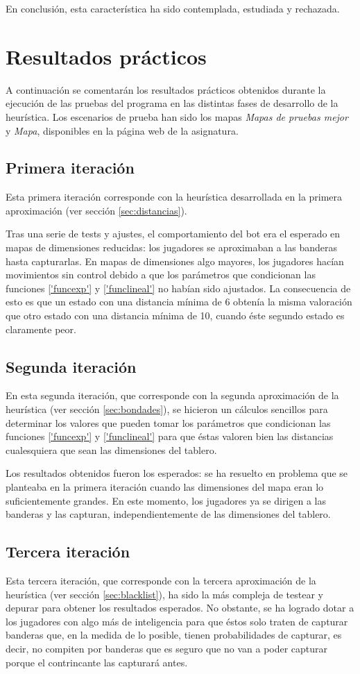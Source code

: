 En conclusión, esta característica ha sido contemplada, estudiada y
rechazada.

\section {Resultados prácticos}
A continuación se comentarán los resultados prácticos obtenidos
durante la ejecución de las pruebas del programa en las distintas
fases de desarrollo de la heurística. Los escenarios de prueba han
sido los mapas \emph{Mapas de pruebas mejor} y \emph{Mapa},
disponibles en la página web de la asignatura.

\subsection{Primera iteración}
Esta primera iteración corresponde con la heurística desarrollada en
la primera aproximación (ver sección \ref{sec:distancias}).

Tras una serie de tests y ajustes, el comportamiento del bot era el
esperado en mapas de dimensiones reducidas: los jugadores se
aproximaban a las banderas hasta capturarlas. En mapas de dimensiones
algo mayores, los jugadores hacían movimientos sin control debido a
que los parámetros que condicionan las funciones \ref{'funcexp'} y
\ref{'funclineal'} no habían sido ajustados. La consecuencia de esto
es que un estado con una distancia mínima de 6 obtenía la misma
valoración que otro estado con una distancia mínima de 10, cuando éste
segundo estado es claramente peor.

\subsection{Segunda iteración}
En esta segunda iteración, que corresponde con la segunda aproximación
de la heurística (ver sección \ref{sec:bondades}), se hicieron un
cálculos sencillos para determinar los valores que pueden tomar los
parámetros que condicionan las funciones \ref{'funcexp'} y
\ref{'funclineal'} para que éstas valoren bien las distancias
cualesquiera que sean las dimensiones del tablero.

Los resultados obtenidos fueron los esperados: se ha resuelto en
problema que se planteaba en la primera iteración cuando las
dimensiones del mapa eran lo suficientemente grandes. En este momento,
los jugadores ya se dirigen a las banderas y las capturan,
independientemente de las dimensiones del tablero.

\subsection{Tercera iteración}
Esta tercera iteración, que corresponde con la tercera aproximación de
la heurística (ver sección \ref{sec:blacklist}), ha sido la más
compleja de testear y depurar para obtener los resultados
esperados. No obstante, se ha logrado dotar a los jugadores con algo
más de inteligencia para que éstos solo traten de capturar banderas
que, en la medida de lo posible, tienen probabilidades de capturar,
es decir, no compiten por banderas que es seguro que no van a poder
capturar porque el contrincante las capturará antes.

